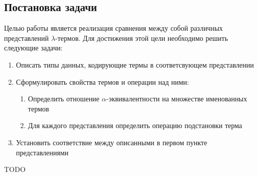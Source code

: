 \subsection{Постановка задачи}

Целью работы является реализация сравнения между собой различных представлений $\lambda$-термов. Для достижения этой цели необходимо решить следующие задачи:

\begin{enumerate}
  \item Описать типы данных, кодирующие термы в соответсвующем представлении
  \item Сформулировать свойства термов и операции над ними:
    \begin{enumerate}
      \item Определить отношение $\alpha$-эквивалентности на множестве именованных термов
      \item Для каждого представления определить операцию подстановки терма
    \end{enumerate}
  \item Установить соответствие между описанными в первом пункте представлениями
\end{enumerate}

TODO
